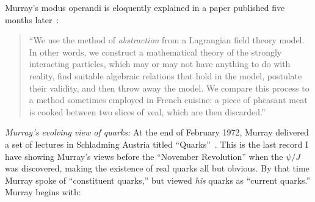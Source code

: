 \documentclass[12pt]{article}
\begin{document}
Murray's modus operandi is eloquently explained in a paper published five months later~\cite{MGMcurrents}:
\begin{quote}
``We use the method of {\it abstraction} from a Lagrangian field theory model. In other words, we construct a mathematical theory of the strongly interacting particles, which may or may not have anything to do with reality, find suitable algebraic relations that hold in the model, postulate their validity, and then throw away the model. We compare this process to a method sometimes employed in French cuisine: a piece of pheasant meat is cooked between two slices of veal, which are then discarded.''
\end{quote}

{\it Murray's evolving view of quarks:} At the end of February 1972, Murray delivered a set of lectures in Schladming Austria titled ``Quarks''~\cite{MGMquarks}. This is the last record I have showing Murray's views before the ``November Revolution'' when the $\psi/J$ was discovered, making the existence of real quarks all but obvious. By that time Murray spoke of ``constituent quarks,'' but viewed {\it his} quarks as ``current quarks.'' Murray begins with:
\end{document}
